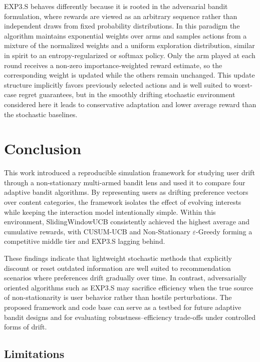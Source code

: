 \documentclass[pdflatex,sn-mathphys-num]{sn-jnl}
\theoremstyle{thmstyleone}%
\theoremstyle{thmstyletwo}%
\theoremstyle{thmstylethree}%
\begin{document}
EXP3.S behaves differently because it is rooted in the adversarial bandit
formulation, where rewards are viewed as an arbitrary sequence rather than
independent draws from fixed probability distributions. In this paradigm the
algorithm maintains exponential weights over arms and samples actions from a
mixture of the normalized weights and a uniform exploration distribution,
similar in spirit to an entropy-regularized or softmax policy. Only the arm
played at each round receives a non-zero importance-weighted reward estimate,
so the corresponding weight is updated while the others remain unchanged. This
update structure implicitly favors previously selected actions and is well
suited to worst-case regret guarantees, but in the smoothly drifting stochastic
environment considered here it leads to conservative adaptation and lower
average reward than the stochastic baselines.

\section{Conclusion}\label{sec6}

This work introduced a reproducible simulation framework for studying user drift
through a non-stationary multi-armed bandit lens and used it to compare four
adaptive bandit algorithms. By representing users as drifting preference
vectors over content categories, the framework isolates the effect of evolving
interests while keeping the interaction model intentionally simple. Within this
environment, SlidingWindowUCB consistently achieved the highest average and
cumulative rewards, with CUSUM-UCB and Non-Stationary $\varepsilon$-Greedy
forming a competitive middle tier and EXP3.S lagging behind.

These findings indicate that lightweight stochastic methods that explicitly
discount or reset outdated information are well suited to recommendation
scenarios where preferences drift gradually over time. In contrast,
adversarially oriented algorithms such as EXP3.S may sacrifice efficiency when
the true source of non-stationarity is user behavior rather than hostile
perturbations. The proposed framework and code base can serve as a testbed for
future adaptive bandit designs and for evaluating robustness–efficiency
trade-offs under controlled forms of drift.

\subsection{Limitations}\label{sec6-1}
\end{document}

